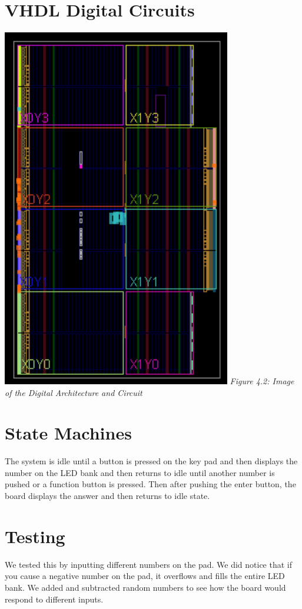  \section{VHDL Digital Circuits}
    \includegraphics[width=100mm]{lab4/hexcalcimgthing.png}
    \emph{Figure 4.2: Image of the Digital Architecture and Circuit}
 \section{State Machines}
    The system is idle until a button is pressed on the key pad and then displays the number on the LED bank and then returns to idle until another number is pushed or a function button is pressed. Then after pushing the enter button, the board displays the answer and then returns to idle state. 
 \section{Testing}
    We tested this by inputting different numbers on the pad. We did notice that if you cause a negative number on the pad, it overflows and fills the entire LED bank. We added and subtracted random numbers to see how the board would respond to different inputs. 
